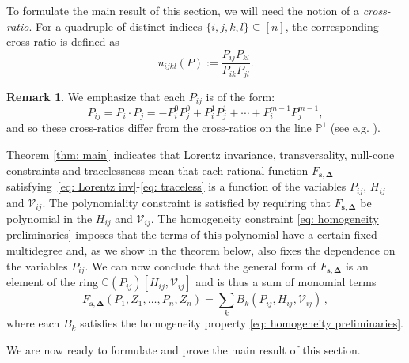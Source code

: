 \documentclass[12pt,a4paper]{extarticle}
\theoremstyle{definition}
\newtheorem{remark}[theorem]{Remark}
\begin{document}
\medskip

To formulate the main result of this section, we will need the notion of a \textit{cross-ratio}. For a quadruple of distinct indices $\{i,j,k,l\}\subseteq [n]$, the corresponding cross-ratio is defined as 
$$u_{ijkl}(P):=\dfrac{P_{ij}P_{kl}}{P_{ik}P_{jl}}.$$

\begin{remark}
    We emphasize that each $P_{ij}$ is of the form:
    \begin{equation*}
        P_{ij}=P_i\cdot P_j=-P_i^0P_j^0+P_i^1P_j^1+\cdots+P_i^{m-1}P_j^{m-1},
    \end{equation*}
    and so these cross-ratios differ from the cross-ratios on the line $\mathbb{P}^1$ (see e.g. \cite[Section 1]{lammoduli}).
\end{remark}

Theorem \ref{thm: main} indicates that Lorentz invariance, transversality, null-cone constraints and tracelessness mean that each rational function $F_{\mathbf{s},\mathbf{\Delta}}$ satisfying~\eqref{eq: Lorentz inv}-\eqref{eq: traceless} is a function of the variables $P_{ij}$, $H_{ij}$ and $\mathcal{V}_{ij}$. The polynomiality constraint is satisfied by requiring that $F_{\mathbf{s},\mathbf{\Delta}}$ be polynomial in the $H_{ij}$ and $\mathcal{V}_{ij}$. 
The homogeneity constraint \eqref{eq: homogeneity preliminaries} imposes that the terms of this polynomial have a certain fixed multidegree and, as we show in the theorem below, also fixes the dependence on the variables $P_{ij}$.
We can now conclude that the general form of $F_{\mathbf{s},\mathbf{\Delta}}$ is an element of the ring $\mathbb{C}(P_{ij})[H_{ij},\mathcal{V}_{ij}]$ and is thus a sum of monomial terms
\begin{equation}\label{eqn: general F}
    F_{\mathbf{s},\mathbf{\Delta}}(P_1,Z_1,\ldots,P_n,Z_n)=\sum_{k}B_k(P_{ij},H_{ij},\mathcal{V}_{ij})\,,
\end{equation}
where each $B_k$ satisfies the homogeneity property \eqref{eq: homogeneity preliminaries}.

\medskip

We are now ready to formulate and prove the main result of this section.
\end{document}
